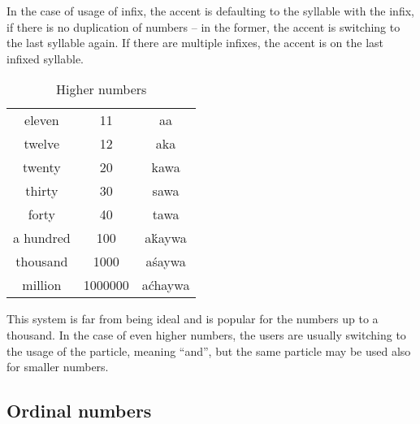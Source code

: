 
In the case of usage of  infix, the accent is defaulting to the syllable
with the infix, if there is no duplication of numbers -- in the former, the
accent is switching to the last syllable again. If there are multiple 
infixes, the accent is on the last infixed syllable.

\begin{table}[ht]
  \centering
  \caption{Higher numbers}
  \begin{tabular}{ccc} \toprule
    eleven    & 11      & aa      \\
    twelve    & 12      & aka     \\
    twenty    & 20      & kawa    \\
    thirty    & 30      & sawa    \\
    forty     & 40      & tawa    \\
    a hundred & 100     & aḱaywa  \\
    thousand  & 1000    & aśaywa  \\
    million   & 1000000 & aćhaywa \\\bottomrule
  \end{tabular}
  \label{tab:numerals2}
\end{table}

This system is far from being ideal and is popular for the numbers up to a
thousand. In the case of even higher numbers, the users are usually switching to
the usage of the  particle, meaning ``and'', but the same particle
may be used also for smaller numbers.




\subsection{Ordinal numbers}

